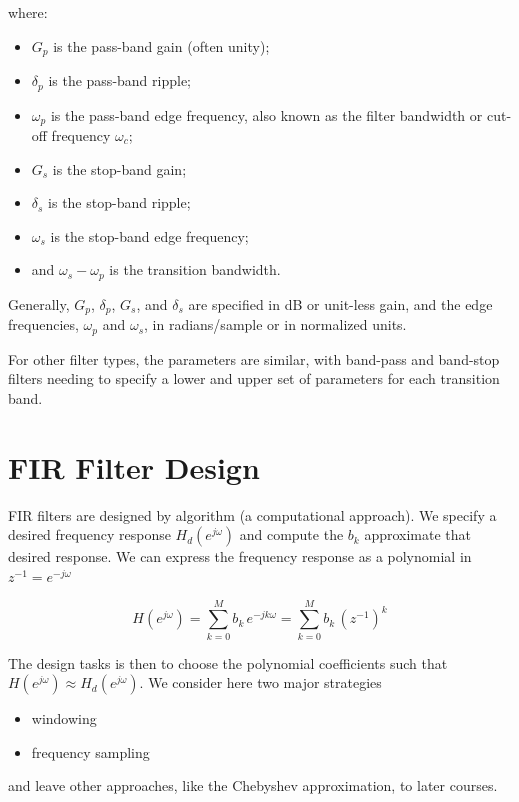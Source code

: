 \documentclass{article}
\begin{document}
where:

\begin{itemize}
\item $G_p$ is the pass-band gain (often unity);
\item $\delta_p$ is the pass-band ripple;
\item $\omega_p$ is the pass-band edge frequency, also known as the filter bandwidth or cut-off frequency $\omega_c$;
\item $G_s$ is the stop-band gain;
\item $\delta_s$ is the stop-band ripple;
\item $\omega_s$ is the stop-band edge frequency;
\item and $\omega_s - \omega_p$ is the transition bandwidth.
\end{itemize}

Generally, $G_p$, $\delta_p$, $G_s$, and $\delta_s$ are specified in dB or unit-less gain, and the edge frequencies, $\omega_p$ and $\omega_s$, in radians/sample or in normalized units.

For other filter types, the parameters are similar, with band-pass and band-stop filters needing to specify a lower and upper set of parameters for each transition band.

\section{FIR Filter Design}

FIR filters are designed by algorithm (a computational approach). We specify a desired frequency response $H_d\left(e^{j\omega} \right)$ and compute the $b_k$ approximate that desired response. We can express the frequency response as a polynomial in $z^{-1} = e^{-j\omega}$

\[
H\left(e^{j\omega} \right) = \sum\limits_{k=0}^{M} b_k\, e^{-jk\omega} = \sum\limits_{k=0}^{M} b_k\, \left(z^{-1}\right)^k 
\]

The design tasks is then to choose the polynomial coefficients such that $H\left(e^{j\omega} \right) \approx H_d\left(e^{j\omega} \right)$. We consider here two major strategies

\begin{itemize}
\item windowing
\item frequency sampling
\end{itemize}

and leave other approaches, like the Chebyshev approximation, to later courses.
\end{document}
